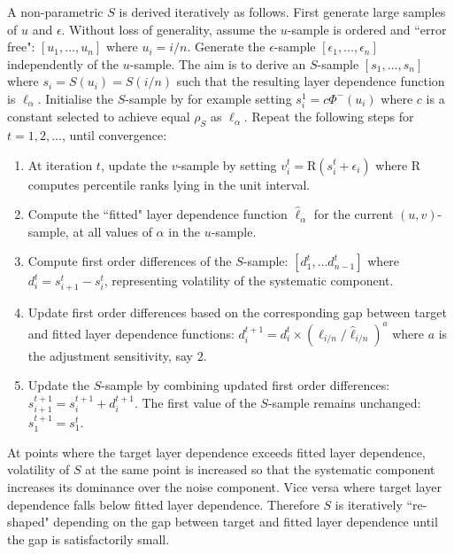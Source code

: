 \documentclass[authoryear]{elsarticle}
\newcommand{\R}{{\mathrm R}}
\begin{document}
A non-parametric $S$ is derived iteratively as follows. First generate large samples of $u$ and $\epsilon$. Without loss of generality, assume the $u$-sample is ordered and ``error free": $[u_1,\ldots,u_n]$ where $u_i=i/n$. Generate the $\epsilon$-sample $[\epsilon_1,\ldots,\epsilon_n]$ independently of the $u$-sample. The aim is to derive an $S$-sample $[s_1,\ldots,s_n]$ where $s_i=S(u_i)=S(i/n)$ such that the resulting layer dependence function is $\ell_\alpha$. Initialise the $S$-sample by for example setting $s_i^1=c\Phi^-(u_i)$ where $c$ is a constant selected to achieve equal  $\rho_S$ as $\ell_\alpha$. Repeat the following steps for $t=1,2,\ldots$, until convergence:
\begin{enumerate}
\item At iteration $t$, update the $v$-sample by setting $v_i^t=\R(s_i^t+\epsilon_i)$ where $\R$ computes percentile ranks lying in the unit interval.
\newline

\item Compute the ``fitted" layer dependence function $\hat{\ell}_\alpha$ for the current $(u,v)$-sample, at all values of $\alpha$ in the $u$-sample.
\newline

\item Compute first order differences of the $S$-sample: $[d_1^t,\ldots d_{n-1}^t]$ where $d_i^t=s_{i+1}^t-s_i^t$, representing volatility of the systematic component.
\newline

\item Update first order differences based on the corresponding gap between target and fitted layer dependence functions: $d_i^{t+1}=d_i^t \times (\ell_{i/n}/\hat{\ell}_{i/n})^a$ where $a$ is the adjustment sensitivity, say $2$.
\newline

\item Update the $S$-sample by combining updated first order differences: $s_{i+1}^{t+1}=s_i^{t+1}+d_i^{t+1}$. The first value of the $S$-sample remains unchanged: $s_1^{t+1}=s_1^t$.

\end{enumerate}
At points where the target layer dependence exceeds fitted layer dependence, volatility of $S$ at the same point is increased so that the systematic component increases its dominance over the noise component. Vice versa where target layer dependence falls below fitted layer dependence. Therefore $S$ is iteratively ``re-shaped" depending on the gap between target and fitted layer dependence until the gap is satisfactorily small.
\end{document}
